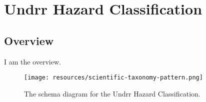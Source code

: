 
\section{Undrr Hazard Classification}
\label{sec:undrr-hazard-classification}
\subsection{Overview}
\label{ssec:overview}

I am the overview.

\begin{figure}[h!]
  \begin{center}
    \texttt{[image: resources/scientific-taxonomy-pattern.png]}
  \end{center}
  \caption{The schema diagram for the Undrr Hazard Classification.}
  \label{fig:ov-diagram}
\end{figure}


